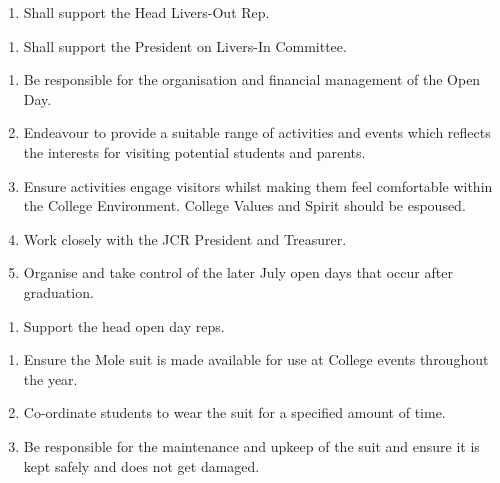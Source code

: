 \begin{enumerate}
    \item Shall support the Head Livers-Out Rep.
\end{enumerate}

\begin{enumerate}
    \item Shall support the President on Livers-In Committee.
\end{enumerate}

\begin{enumerate}
    \item Be responsible for the organisation and financial management of the Open Day.
    \item Endeavour to provide a suitable range of activities and events which reflects the interests for visiting potential students and parents.
    \item Ensure activities engage visitors whilst making them feel comfortable within the College Environment. College Values and Spirit should be espoused.
    \item Work closely with the JCR President and Treasurer.
    \item Organise and take control of the later July open days that occur after graduation.
    
\end{enumerate}

\begin{enumerate}
    \item Support the head open day reps.
\end{enumerate}

\begin{enumerate}
    \item Ensure the Mole suit is made available for use at College events throughout the year.
    \item Co-ordinate students to wear the suit for a specified amount of time.
    \item Be responsible for the maintenance and upkeep of the suit and ensure it is kept safely and does not get damaged.
    
\end{enumerate}

